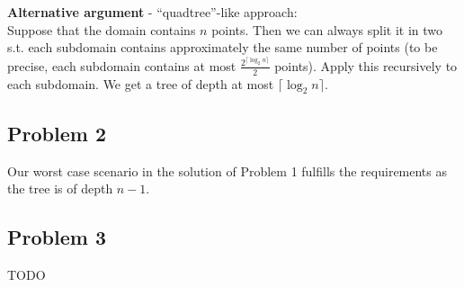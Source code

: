 \textbf{Alternative argument} - ``quadtree''-like approach:\\
Suppose that the domain contains $n$ points. Then we can always split it in two s.t. each subdomain contains approximately the same number of points (to be precise, each subdomain contains at most $\frac{2^{\lceil\log_2n\rceil}}{2}$ points). Apply this recursively to each subdomain. We get a tree of depth at most $\lceil\log_2n\rceil$.

\subsection*{Problem 2}
Our worst case scenario in the solution of Problem 1 fulfills the requirements as the tree is of depth $n-1$.

\subsection*{Problem 3}
TODO
